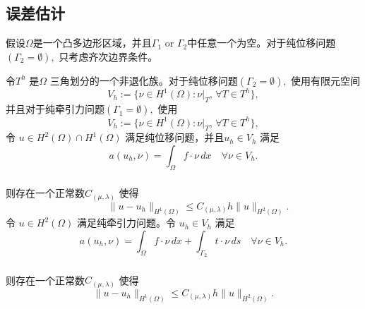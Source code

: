 \documentclass[a4paper,UTF8,titlepage,10pt]{ctexart}
\numberwithin{equation}{subsection}
\begin{document}
\subsection{误差估计}

假设$\Omega$是一个凸多边形区域，并且$\Gamma_1$ or $\Gamma_2$中任意一个为空。对于纯位移问题$(\Gamma_2=\emptyset),$ 只考虑齐次边界条件。
\par
令$T^h$ 是$\Omega$ 三角划分的一个非退化族。对于纯位移问题$(\Gamma_2=\emptyset),$ 使用有限元空间
$$
V_h := \{ \nu \in H^1(\Omega) : \nu |_{T} , \, \forall T \in T^h \},
$$
并且对于纯牵引力问题$(\Gamma_1 = \emptyset),$ 使用
	$$
	V_h := \{ \nu \in H^1(\Omega) : \nu |_{T} , \, \forall T \in T^h \},
	$$
	令 $u \in H^2(\Omega) \cap H^1(\Omega)$ 满足纯位移问题，并且$u_h \in V_h$ 满足
	\begin{equation}
	a(u_h, \nu) = \int_{\Omega} f \cdot \nu \, dx \quad \forall \nu \in V_h.
	\end{equation}
	\\
	则存在一个正常数$C_{(\mu, \lambda)}$ 使得\textsuperscript{\cite{brenner2008mathematical}}
	\begin{equation}
	\quad \quad \quad
	\| u - u_h \|_{H^1(\Omega)} \le C_{(\mu, \lambda)} h \| u \|_{H^2(\Omega)}.
	\end{equation}
	令 $u \in H^2(\Omega)$ 满足纯牵引力问题。令 $u_h \in V_h$ 满足
	\begin{equation}
	a(u_h,\nu) = \int_{\Omega} f \cdot \nu \, dx + \int_{\Gamma_2} t \cdot \nu \, ds \quad \forall \nu \in V_h.
	\end{equation}
	\\
	则存在一个正常数$C_{(\mu, \lambda)}$ 使得\textsuperscript{\cite{brenner2008mathematical}}
	\begin{equation}
	\| u - u_h \|_{H^1(\Omega)} \le C_{(\mu, \lambda)} h \| u \|_{H^2(\Omega)}.
	\end{equation}
\end{document}
